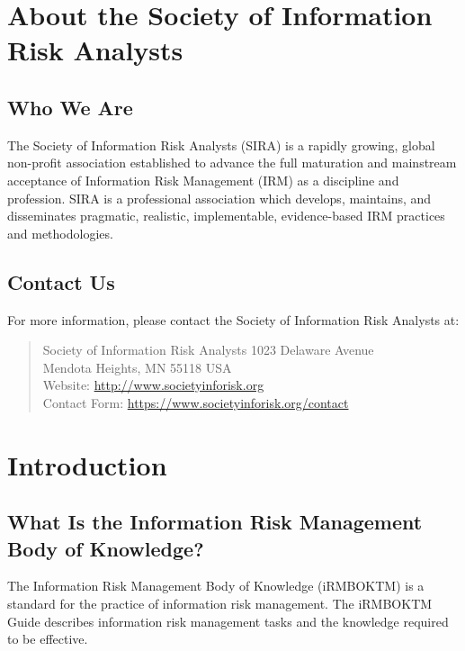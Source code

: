 \chapter{About the Society of Information Risk
Analysts}\label{about-the-society-of-information-risk-analysts}

\section{Who We Are}\label{who-we-are}

The Society of Information Risk Analysts (SIRA) is a rapidly
growing, global non-profit association established to advance the full
maturation and mainstream acceptance of Information Risk Management
(IRM) as a discipline and profession. SIRA is a professional association
which develops, maintains, and disseminates pragmatic, realistic,
implementable, evidence-based IRM practices and methodologies.

\section{Contact Us}\label{contact-us}

For more information, please contact the Society of Information Risk
Analysts at:

\begin{quote}
Society of Information Risk Analysts 1023 Delaware Avenue\\ Mendota
Heights, MN 55118 USA\\ Website: \url{http://www.societyinforisk.org}\\
Contact Form: \url{https://www.societyinforisk.org/contact}
\end{quote}

\chapter{Introduction}\label{introduction}

\section{What Is the Information Risk Management Body of
Knowledge?}\label{what-is-the-information-risk-management-body-of-knowledge}

The Information Risk Management Body of Knowledge (iRMBOKTM) is a
standard for the practice of information risk management.
 The iRMBOKTM Guide describes information risk
management tasks and the knowledge required to be effective.

